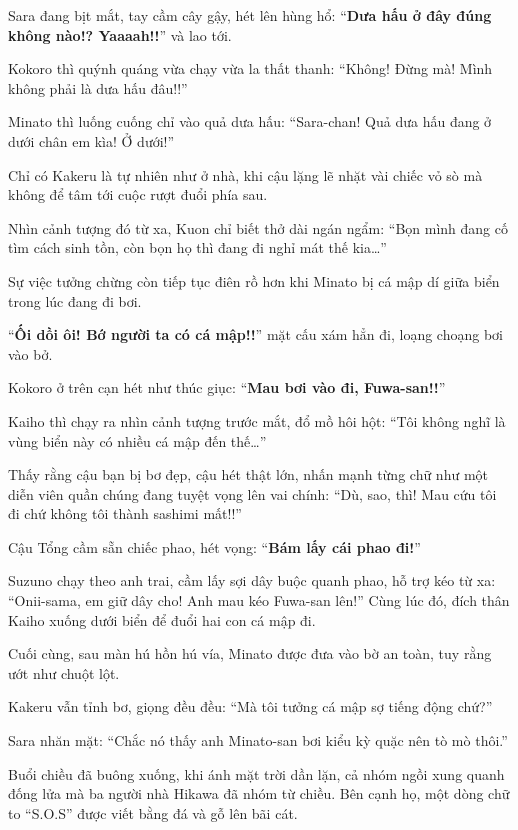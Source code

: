 \documentclass[../main.tex]{subfiles}
\begin{document}

Sara đang bịt mắt, tay cầm cây gậy, hét lên hùng hổ: ``\textbf{Dưa hấu ở đây đúng không nào!? Yaaaah!!}'' và lao tới.

Kokoro thì quýnh quáng vừa chạy vừa la thất thanh: ``Không! Đừng mà! Mình không phải là dưa hấu đâu!!''

Minato thì luống cuống chỉ vào quả dưa hấu: ``Sara-chan! Quả dưa hấu đang ở dưới chân em kìa! Ở dưới!''

Chỉ có Kakeru là tự nhiên như ở nhà, khi cậu lặng lẽ nhặt vài chiếc vỏ sò mà không để tâm tới cuộc rượt đuổi phía sau.

Nhìn cảnh tượng đó từ xa, Kuon chỉ biết thở dài ngán ngẩm: ``Bọn mình đang cố tìm cách sinh tồn, còn bọn họ thì đang đi nghỉ mát thế kia\dots''

\ct

Sự việc tưởng chừng còn tiếp tục điên rồ hơn khi Minato bị cá mập dí giữa biển trong lúc đang đi bơi.


``\textbf{Ối dồi ôi! Bớ người ta có cá mập!!}'' mặt cấu xám hẳn đi, loạng choạng bơi vào bở.

Kokoro ở trên cạn hét như thúc giục: ``\textbf{Mau bơi vào đi, Fuwa-san!!}''

Kaiho thì chạy ra nhìn cảnh tượng trước mắt, đổ mồ hôi hột: ``Tôi không nghĩ là vùng biển này có nhiều cá mập đến thế\dots''

Thấy rằng cậu bạn bị bơ đẹp, cậu hét thật lớn, nhấn mạnh từng chữ như một diễn viên quần chúng đang tuyệt vọng lên vai chính: ``Dù, sao, thì! Mau cứu tôi đi chứ không tôi thành sashimi mất!!''

Cậu Tổng cầm sẵn chiếc phao, hét vọng: ``\textbf{Bám lấy cái phao đi!}''

Suzuno chạy theo anh trai, cầm lấy sợi dây buộc quanh phao, hỗ trợ kéo từ xa: ``Onii-sama, em giữ dây cho! Anh mau kéo Fuwa-san lên!'' Cùng lúc đó, đích thân Kaiho xuống dưới biển để đuổi hai con cá mập đi.

Cuối cùng, sau màn hú hồn hú vía, Minato được đưa vào bờ an toàn, tuy rằng ướt như chuột lột.

Kakeru vẫn tỉnh bơ, giọng đều đều: ``Mà tôi tưởng cá mập sợ tiếng động chứ?''

Sara nhăn mặt: ``Chắc nó thấy anh Minato-san bơi kiểu kỳ quặc nên tò mò thôi.''

\ct

Buổi chiều đã buông xuống, khi ánh mặt trời dần lặn, cả nhóm ngồi xung quanh đống lửa mà ba người nhà Hikawa đã nhóm từ chiều. Bên cạnh họ, một dòng chữ to ``S.O.S'' được viết bằng đá và gỗ lên bãi cát.
\end{document}
